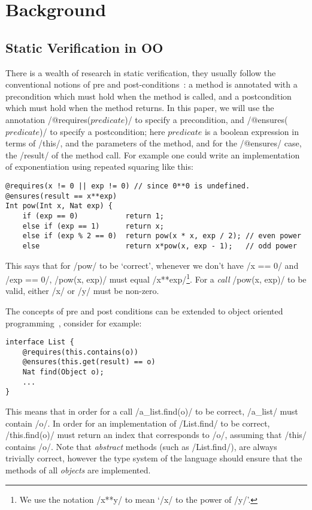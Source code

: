 \section{Background}
\subsection{Static Verification in OO}
There is a wealth of research in static verification, they usually follow the conventional notions of pre and post-conditions~\cite{?}: a method is annotated with a precondition which must hold when the method is called, and a postcondition which must hold when the method returns. In this paper, we will use the annotation /@requires($predicate$)/ to specify a precondition, and /@ensures($predicate$)/ to specify a postcondition; here $predicate$ is a boolean expression in terms of /this/, and the parameters of the method, and for the /@ensures/ case, the /result/ of the method call. For example one could write an implementation of exponentiation using repeated squaring like this:
\begin{lstlisting}
@requires(x != 0 || exp != 0) // since 0**0 is undefined.
@ensures(result == x**exp)
Int pow(Int x, Nat exp) {
	if (exp == 0)           return 1;
	else if (exp == 1)      return x;
	else if (exp % 2 == 0)  return pow(x * x, exp / 2); // even power
	else                    return x*pow(x, exp - 1);   // odd power
\end{lstlisting}
This says that for /pow/ to be `correct', whenever we don't have /x == 0/ and /exp == 0/, /pow(x, exp)/ must equal /x**exp/\footnote{We use the notation /x**y/ to mean `/x/ to the power of /y/'.}. For a \emph{call} /pow(x, exp)/ to be valid, either /x/ or /y/ must be non-zero.

The concepts of pre and post conditions can be extended to object oriented programming~\cite{?}, consider for example:
\begin{lstlisting}
interface List {
	@requires(this.contains(o))
	@ensures(this.get(result) == o)
	Nat find(Object o);
	...
}
\end{lstlisting}
This means that in order for a call /a_list.find(o)/ to be correct, /a_list/ must contain /o/. In order for an implementation of /List.find/ to be correct, /this.find(o)/ must return an index that corresponds to /o/, assuming that /this/ contains /o/. Note that \emph{abstract} methods (such as /List.find/), are always trivially correct, however the type system of the language should ensure that the methods of all \emph{objects} are implemented.

